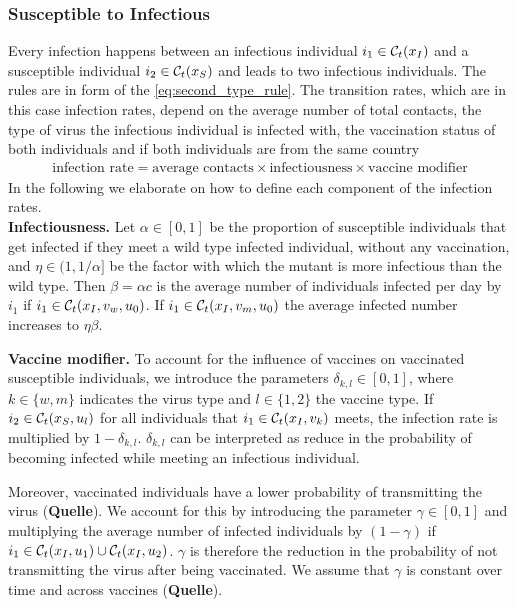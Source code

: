 \subsubsection{Susceptible to Infectious}
Every infection happens between an infectious individual $i_1 \in \mathcal{C}_t(x_I)$ and a susceptible individual $i_2 \in \mathcal{C}_t(x_S)$ and leads to two infectious individuals. The rules are in form of the \ref{eq:second_type_rule}. The transition rates, which are in this case infection rates, depend on the average number of total contacts, the type of virus the infectious individual is infected with, the vaccination status of both individuals and if both individuals are from the same country
\begin{align*}
\text{infection rate} = \text{average contacts} \times \text{infectiousness} \times \text{vaccine modifier} 
\end{align*}
In the following we elaborate on how to define each component of the infection rates.\\

\textbf{Infectiousness.} Let $\alpha \in [0,1]$ be the proportion of susceptible individuals that get infected if they meet a wild type infected individual, without any vaccination, and $\eta \in (1, 1/\alpha]$ be the factor with which the mutant is more infectious than the wild type. Then $\beta = \alpha c$ is the average number of individuals infected per day by $i_1$ if $i_1 \in \mathcal{C}_t(x_I, v_w, u_0)$. If $i_1 \in \mathcal{C}_t(x_I, v_m, u_0)$ the average infected number increases to $\eta \beta$. 

\textbf{Vaccine modifier.}
To account for the influence of vaccines on vaccinated susceptible individuals, we introduce the parameters $\delta_{k,l} \in [0,1]$, where $k \in \{w, m\}$ indicates the virus type and $l \in \{ 1,2\}$ the vaccine type. If $i_2 \in \mathcal{C}_t(x_S, u_l) $ for all individuals that $i_1 \in \mathcal{C}_t(x_I, v_k)$ meets, the infection rate is multiplied by $1 - \delta_{k,l}$. $\delta_{k,l}$ can be interpreted as reduce in the probability of becoming infected while meeting an infectious individual.

Moreover, vaccinated individuals have a lower probability of transmitting the virus (\textbf{Quelle}). We account for this by introducing the parameter $\gamma \in [0,1]$ and multiplying the average number of infected individuals by $(1 - \gamma)$ if $i_1 \in \mathcal{C}_t(x_I, u_1) \cup \mathcal{C}_t(x_I, u_2)$. $\gamma$ is therefore the reduction in the probability of not transmitting the virus after being vaccinated. We assume that $\gamma$ is constant over time and across vaccines (\textbf{Quelle}). 

